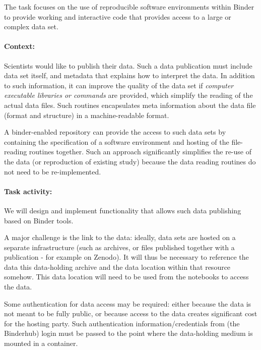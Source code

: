 \begin{task}[
  title=Data publishing,
  id=data-publishing,
  lead=MP,
  PM=8,
  wphases={0-36},
  partners={IFR,UIO}
  ]
  The task focuses on the use of reproducible software environments within
  Binder to provide working and interactive code that provides access to a large
  or complex data set.

  \paragraph*{Context:} Scientists would like to publish their data. Such a data
  publication must include data set itself, and metadata that explains how to
  interpret the data. In addition to such information, it can improve the
  quality of the data set if \emph{computer executable libraries or commands}
  are provided, which simplify the reading of the actual data files. Such
  routines encapsulates meta information about the data file (format and
  structure) in a machine-readable format.

  A binder-enabled repository can provide the access to such data sets by
  containing the specification of a software environment and hosting of the
  file-reading routines together. Such an approach significantly simplifies the
  re-use of the data (or reproduction of existing study) because the data
  reading routines do not need to be re-implemented.

  \paragraph*{Task activity:}
  We will design and implement functionality that allows such data publishing
  based on Binder tools.

  A major challenge is the link to the data: ideally, data sets are hosted on a
  separate infrastructure (such as archives, or files published together with a
  publication - for example on Zenodo). It will thus be necessary to reference
  the data this data-holding archive and the data location within that resource
  somehow. This data location will need to be used from the notebooks to access
  the data. %

  Some authentication for data access may be required: either because the data
  is not meant to be fully public, or because access to the data creates
  significant cost for the hosting party. Such authentication
  information/credentials from (the Binderhub) login must be passed to the point
  where the data-holding medium is mounted in a container.


\end{task}
